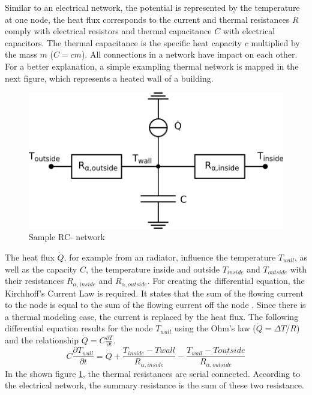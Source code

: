     Similar to an electrical network, the potential is represented by the temperature at one node, the heat flux corresponds to the current and thermal resistances $R$ comply with electrical resistors and thermal capacitance $C$ with electrical capacitors. The thermal capacitance is the specific heat capacity $c$ multiplied by the mass $m$ ($C=cm$). All connections in a network have impact on each other. For a better explanation, a simple exampling thermal network is mapped in the next figure, which represents a heated wall of a building.
    \begin{figure}[h]
    \centering
    \includegraphics[scale=0.8]{figure/beispiel Netzwerk.png}
    \caption{Sample RC- network}
    \label{fig:sampleRCnetwork}
    \end{figure}
    The heat flux $\dot{Q}$, for example from an radiator, influence the temperature $T_{wall}$, as well as the capacity $C$, the temperature inside and outside $T_{inside}$ and $T_{outside}$ with their resistances $R_{\alpha,inside}$ and $R_{\alpha,outside}$.
    For creating the differential equation, the Kirchhoff's Current Law is required. It states that the sum of the flowing current to the node is equal to the sum of the flowing current off the node 
    \cite{Kuchling.2007}. 
    Since there is a thermal modeling case, the current is replaced by the heat flux. The following differential equation results for the node  $T_{wall}$ using the Ohm's law ($\dot{Q}=\Delta T/R$) and the relationship $\dot{Q}=C\frac{\partial T}{\partial t}$.     
    \begin{equation}
    \label{eq:sampledifferential}
    C \frac{\partial T_{wall}}{\partial t} = \dot{Q} + \frac{T_{inside}-T{wall}}{R_{\alpha,inside}} - \frac{T_{wall}-T{outside}}{R_{\alpha,outside}}
    \end{equation}
    In the shown figure \ref{fig:sampleRCnetwork}, the thermal resistances are serial connected. According to the electrical network, the summary resistance is the sum of these two resistance. 

